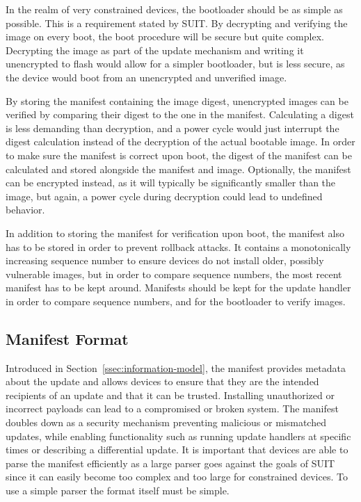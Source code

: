 \documentclass[0-thesis.tex]{subfiles}
\begin{document}
In the realm of very constrained devices, the bootloader should be as simple as possible.
This is a requirement stated by SUIT. By decrypting and verifying the image on every boot,
the boot procedure will be secure but quite complex. Decrypting the image as part of the
update mechanism and writing it unencrypted to flash would allow for a simpler bootloader,
but is less secure, as the device would boot from an unencrypted and unverified image.

By storing the manifest containing the image digest, unencrypted images can be verified by
comparing their digest to the one in the manifest. Calculating a digest is less demanding
than decryption, and a power cycle would just interrupt the digest calculation instead of
the decryption of the actual bootable image. In order to make sure the manifest is correct
upon boot, the digest of the manifest can be calculated and stored alongside the manifest
and image. Optionally, the manifest can be encrypted instead, as it will typically be
significantly smaller than the image, but again, a power cycle during decryption could
lead to undefined behavior.

In addition to storing the manifest for verification upon boot, the manifest also has to
be stored in order to prevent rollback attacks. It contains a monotonically increasing
sequence number to ensure devices do not install older, possibly vulnerable images, but in
order to compare sequence numbers, the most recent manifest has to be kept around.
Manifests should be kept for the update handler in order to compare sequence numbers, and
for the bootloader to verify images.

\subsection{Manifest Format}
\label{ssec:manifest-format}
Introduced in Section~\ref{ssec:information-model}, the manifest provides metadata about
the update and allows devices to ensure that they are the intended recipients of an update
and that it can be trusted. Installing unauthorized or incorrect payloads can lead to a
compromised or broken system. The manifest doubles down as a security mechanism preventing
malicious or mismatched updates, while enabling functionality such as running update
handlers at specific times or describing a differential update. It is important that
devices are able to parse the manifest efficiently as a large parser goes against the
goals of SUIT since it can easily become too complex and too large for constrained
devices. To use a simple parser the format itself must be simple.
\end{document}
